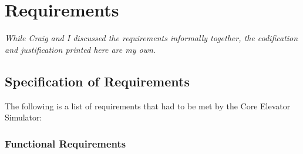 \documentclass{UoYCSproject}
\begin{document}
\section{Requirements}

\textit{While Craig and I discussed the requirements informally together, the codification and justification printed here are my own.}

\subsection{Specification of Requirements}

The following is a list of requirements that had to be met by the Core Elevator Simulator:

\subsubsection{Functional Requirements}
\end{document}
